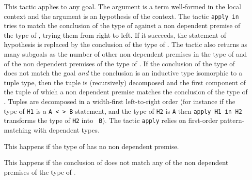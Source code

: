 This tactic applies to any goal.  The argument {\term} is a term
well-formed in the local context and the argument {\ident} is an
hypothesis of the context.  The tactic {\tt apply {\term} in {\ident}}
tries to match the conclusion of the type of {\ident} against a non
dependent premise of the type of {\term}, trying them from right to
left.  If it succeeds, the statement of hypothesis {\ident} is
replaced by the conclusion of the type of {\term}. The tactic also
returns as many subgoals as the number of other non dependent premises
in the type of {\term} and of the non dependent premises of the type
of {\ident}.  If the conclusion of the type of {\term} does not match
the goal {\em and} the conclusion is an inductive type isomorphic to a
tuple type, then the tuple is (recursively) decomposed and the first
component of the tuple of which a non dependent premise matches the
conclusion of the type of {\ident}. Tuples are decomposed in a
width-first left-to-right order (for instance if the type of {\tt H1}
is a \verb=A <-> B= statement, and the type of {\tt H2} is \verb=A=
then {\tt apply H1 in H2} transforms the type of {\tt H2} into {\tt
  B}). The tactic {\tt apply} relies on first-order pattern-matching
with dependent types.

\begin{ErrMsgs}
\item {}

This happens if the type of {\term} has no non dependent premise.

\item {}

This happens if the conclusion of {\ident} does not match any of the
non dependent premises of the type of {\term}.
\end{ErrMsgs}

